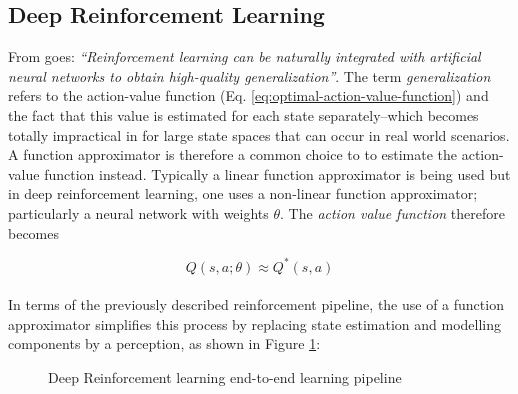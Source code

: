 \subsection{Deep Reinforcement Learning}

From \cite{deeprlcourse} goes: \textit{``Reinforcement learning can be naturally integrated with artificial neural networks to obtain high-quality generalization''}.
The term \textit{generalization} refers to the action-value function (Eq. \ref{eq:optimal-action-value-function}) and the fact that this value is estimated for each state separately--which becomes totally impractical in for large state spaces that can occur in real world scenarios.
A function approximator is therefore a common choice to to estimate the action-value function instead. Typically a linear function approximator is being used but in deep reinforcement learning, one uses a non-linear function approximator; particularly a neural network with weights $\theta$. The \textit{action value function} therefore becomes

\begin{equation}
Q(s, a; \theta) \approx Q^*(s,a)
\end{equation}
\\
In terms of the previously described reinforcement pipeline, the use of a function approximator simplifies this process by replacing state estimation and modelling components by a perception, as shown in Figure \ref{fig:drl-pipeline}:
\begin{figure}[H]
    \centering
    \caption{Deep Reinforcement learning end-to-end learning pipeline}
    \label{fig:drl-pipeline}
\end{figure}
